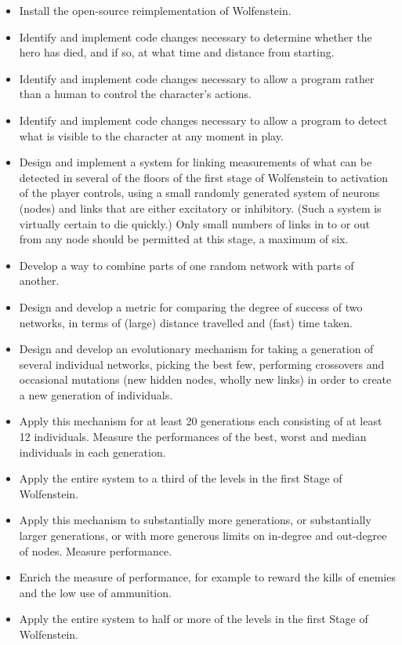 \documentclass[]{Learning-to-Play-Wolfenstein-thesis}
\begin{document}
\begin{itemize}
\item Install the open-source reimplementation of Wolfenstein.
\item Identify and implement code changes necessary to determine whether the hero has died, and if so, at what time and distance from starting.
\item Identify and implement code changes necessary to allow a program rather than a human to control the character's actions.
\item Identify and implement code changes necessary to allow a program to detect what is visible to the character at any moment in play.
\item Design and implement a system for linking measurements of what can be detected in several of the floors of the first stage of Wolfenstein to activation of the player controls, using a small randomly generated system of neurons (nodes) and links that are either excitatory or inhibitory. (Such a system is virtually certain to die quickly.) Only small numbers of links in to or out from any node should be permitted at this stage, a maximum of six.
\item Develop a way to combine parts of one random network with parts of another.
\end{itemize}
\newpage
{}
\begin{itemize}
\item Design and develop a metric for comparing the degree of success of two networks, in terms of (large) distance travelled and (fast) time taken.
\item Design and develop an evolutionary mechanism for taking a generation of several individual networks, picking the best few, performing crossovers and occasional mutations (new hidden nodes, wholly new links) in order to create a new generation of individuals.
\item Apply this mechanism for at least 20 generations each consisting of at least 12 individuals. Measure the performances of the best, worst and median individuals in each generation.
\item Apply the entire system to a third of the levels in the first Stage of Wolfenstein.
\end{itemize}

\begin{itemize}
\item Apply this mechanism to substantially more generations, or substantially larger generations, or with more generous limits on in-degree and out-degree of nodes. Measure performance.
\item Enrich the measure of performance, for example to reward the kills of enemies and the low use of ammunition.
\item Apply the entire system to half or more of the levels in the first Stage of Wolfenstein.
\end{itemize}
\end{document}
